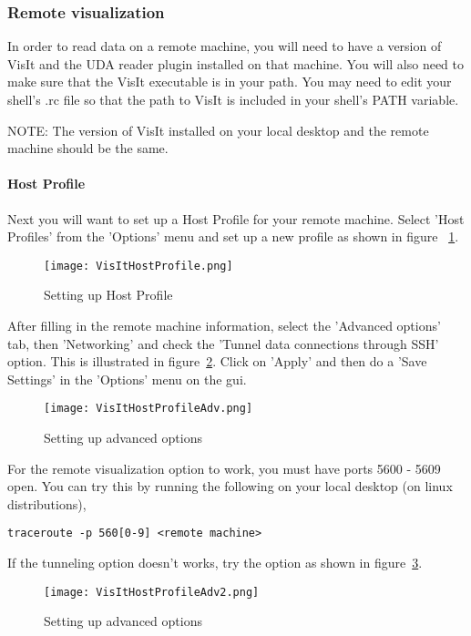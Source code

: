 \subsubsection{Remote visualization}
In order to read data on a remote machine, you will need to have a version of VisIt and the UDA reader plugin installed on that machine. You will also need to make sure that the VisIt executable is in your path. You may need to edit your shell's .rc file so that the path to VisIt is included in your shell's PATH variable.

NOTE: The version of VisIt installed on your local desktop and the remote machine should be the same.

\paragraph{Host Profile}
Next you will want to set up a Host Profile for your remote machine. Select 'Host Profiles' from the 'Options' menu and set up a new profile as shown in figure ~\ref{VisItHostProfile}.

\begin{figure}
  \center
  \texttt{[image: VisItHostProfile.png]}
  \caption{Setting up Host Profile}
  \label{VisItHostProfile}
\end{figure}

After filling in the remote machine information, select the 'Advanced options' tab, then 'Networking' and check the 'Tunnel data connections through SSH' option. This is illustrated in figure~\ref{VisItHostProfileAdv}. Click on 'Apply' and then do a 'Save Settings' in the 'Options' menu on the gui.

\begin{figure}
  \center
  \texttt{[image: VisItHostProfileAdv.png]}
  \caption{Setting up advanced options}
  \label{VisItHostProfileAdv}
\end{figure}

For the remote visualization option to work, you must have ports 5600 - 5609 open. You can try this by running the following on your local desktop (on linux distributions),

\begin{Verbatim}[fontsize=\footnotesize]
traceroute -p 560[0-9] <remote machine> 
\end{Verbatim}

If the tunneling option doesn't works, try the option as shown in figure~\ref{VisItHostProfileAdv2}.

\begin{figure}
  \center
  \texttt{[image: VisItHostProfileAdv2.png]}
  \caption{Setting up advanced options}
  \label{VisItHostProfileAdv2}
\end{figure}

